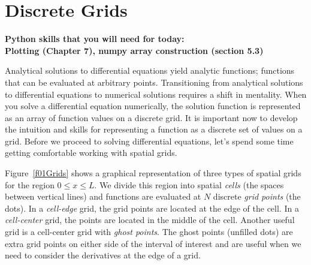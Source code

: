 \chapter[Discrete Grids]{Discrete Grids}
\label{ch:grids}
\begin{center}
\textbf{Python skills that you will need for today:\\
    Plotting (Chapter 7), numpy array construction (section 5.3)}
\end{center}

Analytical solutions to differential equations yield analytic
functions; functions that can be evaluated at arbitrary
points. Transitioning from analytical solutions to differential
equations to numerical solutions requires a shift in mentality.  When
you solve a differential equation numerically, the solution function
is represented as an array of function values on a discrete grid.  It
is important now to develop the intuition and skills for representing
a function as a discrete set of values on a grid.  Before we proceed to
solving differential equations, let's spend some time getting
comfortable working with spatial grids.



Figure~\ref{f01Grids} shows a graphical representation of three
types of spatial grids for the region $0 \le x \le L$.  We divide
this region into spatial \emph{cells} (the spaces between vertical
lines) and functions are evaluated at $N$ discrete \emph{grid
points} (the dots). In a \emph{cell-edge} grid, the grid points are located at the
edge of the cell.  In a \emph{cell-center} grid, the points are located in the middle
of the cell.  Another useful grid is a cell-center grid with {\it
ghost points}. The ghost points (unfilled dots)
are extra grid points on either side of the interval of interest
and are useful when we need to consider the derivatives at the edge
of a grid.


